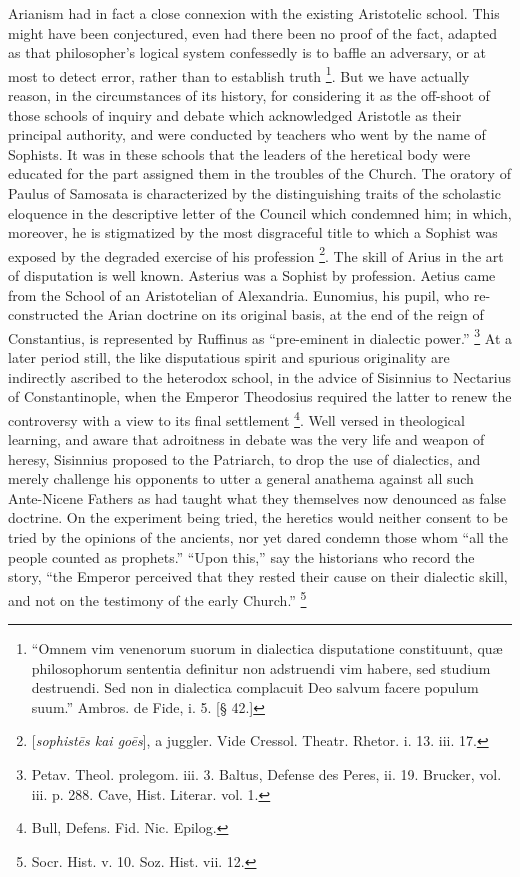 Arianism had in fact a close connexion with the existing
Aristotelic school. This might have been conjectured, even had there
been no proof of the fact, adapted as that philosopher's logical
system confessedly is to baffle an adversary, or at most to detect
error, rather than to establish truth \footnote{``Omnem vim venenorum suorum in dialectica disputatione
constituunt, quæ philosophorum sententia definitur non adstruendi vim
habere, sed studium destruendi. Sed non in dialectica complacuit Deo
salvum facere populum suum.'' Ambros. de Fide, i. 5. [§ 42.]}. But we have actually
reason, in the circumstances of its history, for considering it as the
off-shoot of those schools of inquiry and debate which acknowledged
Aristotle as their principal authority, and were conducted by teachers
who went by the name of Sophists. It was in these schools that the
leaders of the heretical body were educated for the part assigned them
in the troubles of the Church. The oratory of Paulus of Samosata is
characterized by the distinguishing traits of the scholastic eloquence
in the descriptive letter of the Council which condemned him; in
which, moreover, he is stigmatized by the most disgraceful title to
which a Sophist was exposed by the degraded exercise of his
profession \footnote{[\emph{sophist\={e}s kai go\={e}s}], a juggler. Vide
Cressol. Theatr. Rhetor. i. 13. iii. 17.}. The skill of Arius in the art of disputation is
well known. Asterius was a Sophist by profession. Aetius came from the
School of an Aristotelian of Alexandria. Eunomius, his pupil, who
re-constructed the Arian doctrine on its original basis, at the end of
the reign of Constantius, is represented by Ruffinus as
``pre-eminent in dialectic power.'' \footnote{Petav. Theol. prolegom. iii. 3. Baltus, Defense des Peres, ii.
19. Brucker, vol. iii. p. 288. Cave, Hist. Literar. vol. 1.} At a later
period still, the like disputatious spirit and spurious originality
are indirectly ascribed to the heterodox school, in the advice of
Sisinnius to Nectarius of Constantinople, when the Emperor Theodosius
required the latter to renew the controversy with a view to its final
settlement \footnote{Bull, Defens. Fid. Nic. Epilog.}. Well versed in theological learning, and aware
that adroitness in debate was the very life and weapon of heresy,
Sisinnius proposed to the Patriarch, to drop the use of dialectics,
and merely challenge his opponents to utter a general anathema against
all such Ante-Nicene Fathers as had taught what they themselves now
denounced as false doctrine. On the experiment being tried, the
heretics would neither consent to be tried by the opinions of the
ancients, nor yet dared condemn those whom ``all the people
counted as prophets.'' ``Upon this,'' say the historians
who record the story, ``the Emperor perceived that they rested
their cause on their dialectic skill, and not on the testimony of the
early Church.'' \footnote{Socr. Hist. v. 10. Soz. Hist. vii. 12.}


